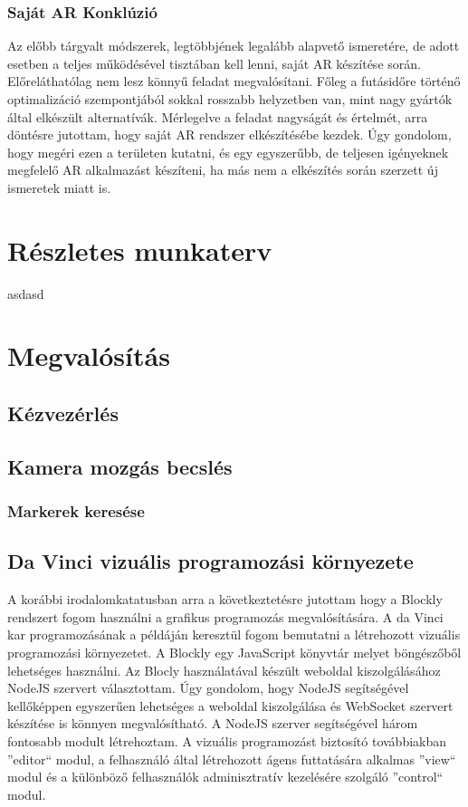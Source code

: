 \documentclass[12pt,a4paper,oneside]{report} %
\begin{document}
\subsection{Saját AR Konklúzió}
Az előbb tárgyalt módszerek, legtöbbjének legalább alapvető ismeretére, de adott esetben a teljes  működésével tisztában kell lenni, saját AR készítése során. Előreláthatólag nem lesz könnyű feladat megvalósítani. Főleg a futásidőre történő optimalizáció szempontjából sokkal rosszabb helyzetben van, mint nagy gyártók által elkészült alternatívák. Mérlegelve a feladat nagyságát és értelmét, arra döntésre jutottam, hogy saját AR rendszer elkészítésébe kezdek. Úgy gondolom, hogy megéri ezen a területen kutatni, és egy egyszerűbb, de teljesen igényeknek megfelelő AR alkalmazást készíteni, ha más nem a elkészítés során szerzett új ismeretek miatt is.

\chapter{Részletes munkaterv}
asdasd
\begin{figure}[H]
\end{figure}
\chapter{Megvalósítás}
\section{Kézvezérlés}
\label{kezvez}
\section{Kamera mozgás becslés}
\subsection{Markerek keresése}

\section{Da Vinci vizuális programozási környezete}
A korábbi irodalomkatatusban arra a következtetésre jutottam hogy a Blockly rendszert fogom használni a  grafikus programozás megvalósítására.
A da Vinci kar programozásának a példáján keresztül fogom bemutatni a létrehozott vizuális programozási környezetet.
A Blockly egy JavaScript könyvtár melyet böngészőből lehetséges használni. Az Blocly használatával készült weboldal kiszolgálásához NodeJS szervert választottam. Úgy gondolom, hogy NodeJS segítségével kellőképpen egyszerűen lehetséges a weboldal kiszolgálása és WebSocket szervert készítése is könnyen megvalósítható. A NodeJS szerver segítségével három fontosabb modult létrehoztam. A vizuális programozást biztosító továbbiakban ''editor`` modul, a felhasználó által létrehozott ágens futtatására alkalmas ''view`` modul és a különböző felhasználók adminisztratív kezelésére szolgáló ''control`` modul.
\end{document}
